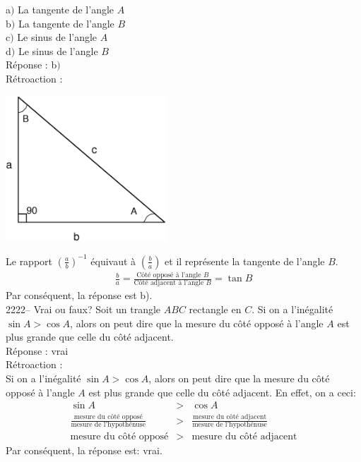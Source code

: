 \documentclass[letterpaper, 12pt]{article}
\begin{document}
a$)$ La tangente de l'angle $A$\\
b$)$ La tangente de l'angle $B$\\
c$)$ Le sinus de l'angle $A$\\
d$)$ Le sinus de l'angle $B$\\

R\'eponse : b$)$\\

R\'etroaction :\\
\begin{center}
 \includegraphics[width=6cm,bb=14 14 591 533]{Triangle_rectangle2.eps}
\end{center}
Le rapport $\left( \frac{a}{b}\right) ^{-1}$ \'equivaut \`a $\left( \frac{b}{a}\right)$ et il repr\'esente la tangente de l'angle $B$.
\begin{eqnarray*}
 \frac{b}{a}=\frac{\textrm{C\^ot\'e oppos\'e \`a l'angle $B$}}{\textrm{C\^ot\'e adjacent \`a l'angle $B$}}=\tan{B}
\end{eqnarray*}
Par cons\'equent, la r\'eponse est b).\\


2222-- Vrai ou faux? Soit un trangle $ABC$ rectangle en $C$. Si on a l'in\'egalit\'e $\sin{A}>\cos{A}$, alors on peut dire que la mesure du c\^ot\'e oppos\'e \`a l'angle $A$ est plus grande que celle du c\^ot\'e adjacent.\\

R\'eponse : vrai\\

R\'etroaction :\\
Si on a l'in\'egalit\'e $\sin{A}>\cos{A}$, alors on peut dire que la mesure du c\^ot\'e oppos\'e \`a l'angle $A$ est plus grande que celle du c\^ot\'e adjacent. En effet, on a ceci:
\begin{eqnarray*}
\sin{A}&>&\cos{A} \\[2mm]
\frac{\textrm{mesure du c\^ot\'e oppos\'e}}{\textrm{mesure de l'hypoth\'enuse}}&>&\frac{\textrm{mesure du c\^ot\'e adjacent}}{\textrm{mesure de l'hypoth\'enuse}} \\[2mm]
\textrm{mesure du c\^ot\'e oppos\'e}&>&\textrm{mesure du c\^ot\'e adjacent}
\end{eqnarray*}
Par cons\'equent, la r\'eponse est: vrai.\\
\end{document}
